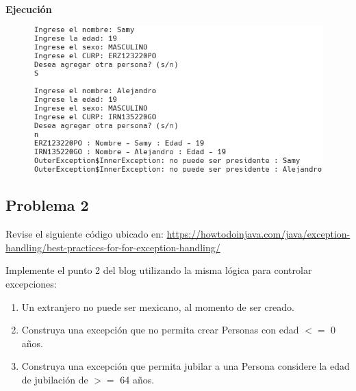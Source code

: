 \documentclass[11pt, twocolumn]{article}
\begin{document}
  \newpage
  \textbf{Ejecución}
  \begin{figure}[h!]
    \centering
    \includegraphics[width=0.9\linewidth]{10P1.png}
  \end{figure}

  \subsection*{Problema 2}
  Revise el siguiente código ubicado en: \url{https://howtodoinjava.com/java/exception-handling/best-practices-for-for-exception-handling/}

  Implemente el punto 2 del blog utilizando la misma lógica para controlar excepciones:

  \begin{enumerate}[label=\alph*)]
    \item Un extranjero no puede ser mexicano, al momento de ser creado.
    \item Construya una excepción que no permita crear Personas con edad $<=$ 0 años.
    \item Construya una excepción que permita jubilar a una Persona considere la edad de jubilación de $>=$ 64 años.
  \end{enumerate}
  
\end{document}
